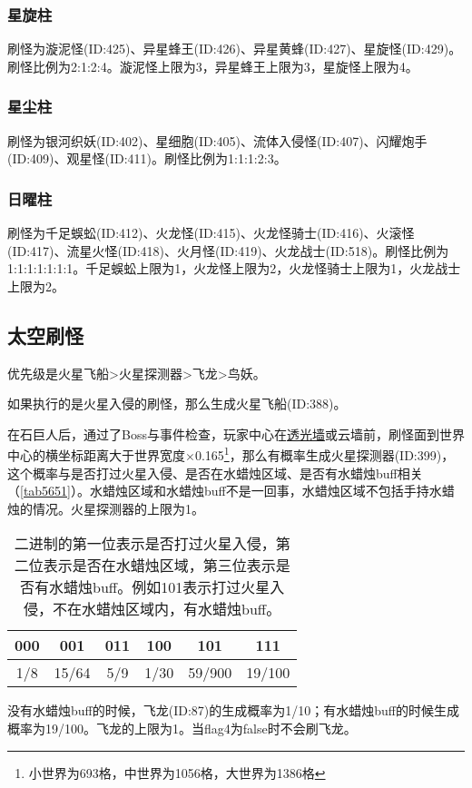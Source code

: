 \subsubsection{星旋柱}
刷怪为漩泥怪(ID:425)、异星蜂王(ID:426)、异星黄蜂(ID:427)、星旋怪(ID:429)。刷怪比例为2:1:2:4。漩泥怪上限为3，异星蜂王上限为3，星旋怪上限为4。

\subsubsection{星尘柱}
刷怪为银河织妖(ID:402)、星细胞(ID:405)、流体入侵怪(ID:407)、闪耀炮手(ID:409)、观星怪(ID:411)。刷怪比例为1:1:1:2:3。

\subsubsection{日曜柱}
刷怪为千足蜈蚣(ID:412)、火龙怪(ID:415)、火龙怪骑士(ID:416)、火滚怪(ID:417)、流星火怪(ID:418)、火月怪(ID:419)、火龙战士(ID:518)。刷怪比例为1:1:1:1:1:1:1。千足蜈蚣上限为1，火龙怪上限为2，火龙怪骑士上限为1，火龙战士上限为2。

\subsection{太空刷怪}
优先级是火星飞船>火星探测器>飞龙>鸟妖。

如果执行的是火星入侵的刷怪，那么生成火星飞船(ID:388)。

在石巨人后，通过了Boss与事件检查，玩家中心在\hyperref[app9]{透光墙}或云墙前，刷怪面到世界中心的横坐标距离大于世界宽度$\times$0.165\footnote{小世界为693格，中世界为1056格，大世界为1386格}，那么有概率生成火星探测器(ID:399)，这个概率与是否打过火星入侵、是否在水蜡烛区域、是否有水蜡烛buff相关（\autoref{tab5651}）。水蜡烛区域和水蜡烛buff不是一回事，水蜡烛区域不包括手持水蜡烛的情况。火星探测器的上限为1。

\begin{table}[!h]
    \centering
    \begin{tabular}{cccccc}
         000&001&011&100&101&111\\\hline
         1/8&15/64&5/9&1/30&59/900&19/100 
    \end{tabular}
    \caption{二进制的第一位表示是否打过火星入侵，第二位表示是否在水蜡烛区域，第三位表示是否有水蜡烛buff。例如101表示打过火星入侵，不在水蜡烛区域内，有水蜡烛buff。}
    \label{tab5651}
\end{table}

没有水蜡烛buff的时候，飞龙(ID:87)的生成概率为1/10；有水蜡烛buff的时候生成概率为19/100。飞龙的上限为1。当flag4为false时不会刷飞龙。

